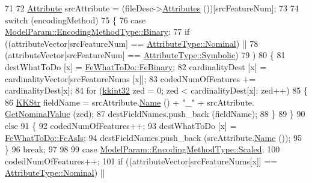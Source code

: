 \begin{DoxyCode}
71 
72     \hyperlink{class_k_k_m_l_l_1_1_attribute}{Attribute}  srcAttribute = (fileDesc->\hyperlink{class_k_k_m_l_l_1_1_file_desc_ae07aab5d923f4c6bc38de38f1d2b2409}{Attributes} ())[srcFeatureNum];
73 
74     \textcolor{keywordflow}{switch} (encodingMethod)
75     \{
76       \textcolor{keywordflow}{case}  \hyperlink{class_k_k_m_l_l_1_1_model_param_a09e49f936f411dba6f08bdaf8d6b4a98a6ce976e8f061b2b5cfe4d0c50c3405dd}{ModelParam::EncodingMethodType::Binary}:
77         \textcolor{keywordflow}{if}  ((attributeVector[srcFeatureNum] == \hyperlink{namespace_k_k_m_l_l_a99973706982b59debba670e2480555aba8c28d7c312116b8a46e2f466cb33d5b4}{AttributeType::Nominal})  ||
78              (attributeVector[srcFeatureNum] == \hyperlink{namespace_k_k_m_l_l_a99973706982b59debba670e2480555abaaddee1396a3e20ceea8071ed6da54866}{AttributeType::Symbolic})
79             )
80         \{
81           destWhatToDo    [x] = \hyperlink{class_k_k_m_l_l_1_1_feature_encoder2_a590f2b852b63095e7347e4cb39d888a7ab88633cd9a2d1569dc1979a5e5cb1752}{FeWhatToDo::FeBinary};
82           cardinalityDest [x] = cardinalityVector[srcFeatureNums [x]];
83           codedNumOfFeatures   += cardinalityDest[x];
84           \textcolor{keywordflow}{for}  (\hyperlink{namespace_k_k_b_a8fa4952cc84fda1de4bec1fbdd8d5b1b}{kkint32} zed = 0;  zed < cardinalityDest[x];  zed++)
85           \{
86             \hyperlink{class_k_k_b_1_1_k_k_str}{KKStr}  fieldName = srcAttribute.\hyperlink{class_k_k_m_l_l_1_1_attribute_a3cd12e05138dfbda83c6802dc984e394}{Name} () + \textcolor{stringliteral}{"\_"} + srcAttribute.
      \hyperlink{class_k_k_m_l_l_1_1_attribute_ad9342fb254fb972f63825f8d5be25311}{GetNominalValue} (zed);
87             destFieldNames.push\_back (fieldName);
88           \}
89         \}
90         \textcolor{keywordflow}{else}
91         \{
92           codedNumOfFeatures++;
93           destWhatToDo [x] = \hyperlink{class_k_k_m_l_l_1_1_feature_encoder2_a590f2b852b63095e7347e4cb39d888a7a8fdde05abb9506fd4caa93ddc4490a13}{FeWhatToDo::FeAsIs};
94           destFieldNames.push\_back (srcAttribute.\hyperlink{class_k_k_m_l_l_1_1_attribute_a3cd12e05138dfbda83c6802dc984e394}{Name} ());
95         \}
96         \textcolor{keywordflow}{break};
97 
98 
99       \textcolor{keywordflow}{case}  \hyperlink{class_k_k_m_l_l_1_1_model_param_a09e49f936f411dba6f08bdaf8d6b4a98a7380ae6c5e1189eef50cfd0557d74e99}{ModelParam::EncodingMethodType::Scaled}:
100         codedNumOfFeatures++;
101         \textcolor{keywordflow}{if}  ((attributeVector[srcFeatureNums[x]] == \hyperlink{namespace_k_k_m_l_l_a99973706982b59debba670e2480555aba8c28d7c312116b8a46e2f466cb33d5b4}{AttributeType::Nominal})  ||

\end{DoxyCode}
